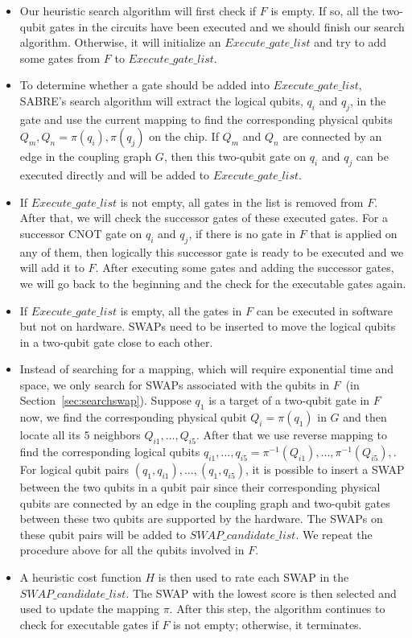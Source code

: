 \documentclass[journal,10pt,twocolumn]{IEEEtran}
\newcommand{\myalgorithmname}{SABRE}
\begin{document}
\begin{itemize}
\item Our heuristic search algorithm will first check if $F$ is empty. 
If so, all the two-qubit gates in the circuits have been executed and we should finish our search algorithm.
Otherwise, it will initialize an $Execute\_gate\_list$ and try to add some gates from $F$ to $Execute\_gate\_list$.

\item To determine whether a gate should be added into $Execute\_gate\_list$, \myalgorithmname's search algorithm will extract the logical qubits, $q_i$ and $q_j$, in the gate and use the current mapping to find the corresponding physical qubits $Q_m,Q_n = \pi(q_i), \pi(q_j)$ on the chip. 
If $Q_m$ and $Q_n$ are connected by an edge in the coupling graph $G$, then this two-qubit gate on $q_i$ and $q_j$ can be executed directly and will be added to $Execute\_gate\_list$.

\item If $Execute\_gate\_list$ is not empty, all gates in the list is removed from $F$.
After that, we will check the successor gates of these executed gates. 
For a successor CNOT gate on $q_i$ and $q_j$, if there is no gate in $F$ that is applied on any of them, then logically this successor gate is ready to be executed and we will add it to $F$. 
After executing some gates and adding the successor gates, we will go back to the beginning and the check for the executable gates again.

\item If $Execute\_gate\_list$ is empty, all the gates in $F$ 
can be executed in software but not on hardware. 
SWAPs need to be inserted to move the logical qubits in a two-qubit gate close to each other.

\item Instead of searching for a mapping, which will require exponential time and space, we only search for SWAPs associated with the qubits in $F$~(in Section~\ref{sec:searchswap}).
Suppose $q_1$  is a target of a two-qubit gate in $F$ now, we find the corresponding physical qubit $Q_i=\pi(q_1)$ in $G$ and then locate all its $5$ neighbors $Q_{i1}, \dots, Q_{i5}$. 
After that we use reverse mapping to find the corresponding logical qubits $q_{i1},\dots,q_{i5} = \pi^{-1}(Q_{i1}),\dots,\pi^{-1}(Q_{i5}),$.
For logical qubit pairs $(q_1, q_{i1}), \dots, (q_1,q_{i5})$, it is possible to insert a SWAP between the two qubits in a qubit pair since their corresponding physical qubits are connected by an edge in the coupling graph and two-qubit gates between these two qubits are supported by the hardware. 
The SWAPs on these qubit pairs will be added to $SWAP\_candidate\_list$.
We repeat the procedure above for all the qubits involved in $F$.

\item A heuristic cost function $H$ is then used to rate each SWAP in the $SWAP\_candidate\_list$.
The SWAP with the lowest score is then selected and used to update the mapping $\pi$.
After this step, the algorithm continues to check for executable gates if $F$ is not empty; otherwise, it terminates.


\end{itemize}
\end{document}

